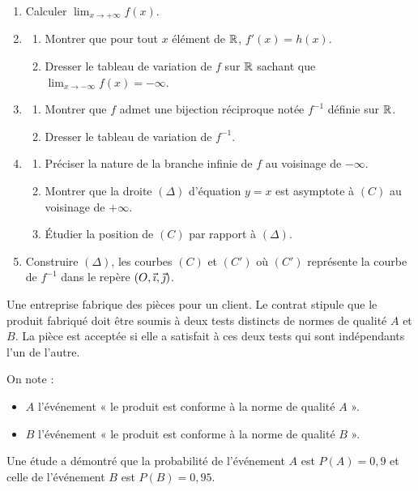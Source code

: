 \documentclass[11pt]{article}
\begin{document}
\begin{enumerate}
  \item Calculer $\displaystyle\lim_{x\to+\infty} f(x)$.
  \item \begin{enumerate}[label=\alph*.]
    \item Montrer que pour tout $x$ élément de $\mathbb{R}$, $f'(x) = h(x)$.
    \item Dresser le tableau de variation de $f$ sur $\mathbb{R}$ sachant que $\displaystyle\lim_{x\to-\infty} f(x) = -\infty$.
  \end{enumerate}
  \item \begin{enumerate}[label=\alph*.]
    \item Montrer que $f$ admet une bijection réciproque notée $f^{-1}$ définie sur $\mathbb{R}$.
    \item Dresser le tableau de variation de $f^{-1}$.
  \end{enumerate}
  \item \begin{enumerate}[label=\alph*.]
    \item Préciser la nature de la branche infinie de $f$ au voisinage de $-\infty$.
    \item Montrer que la droite $(\Delta)$ d'équation $y = x$ est asymptote à $(C)$ au voisinage de $+\infty$.
    \item Étudier la position de $(C)$ par rapport à $(\Delta)$.
  \end{enumerate}
  \item Construire $(\Delta)$, les courbes $(C)$ et $(C')$ où $(C')$ représente la courbe de $f^{-1}$ dans le repère $(O,\vec{\imath},\vec{\jmath})$.
\end{enumerate}


Une entreprise fabrique des pièces pour un client. Le contrat stipule que le produit fabriqué doit être soumis à deux tests distincts de normes de qualité $A$ et $B$. La pièce est acceptée si elle a satisfait à ces deux tests qui sont indépendants l'un de l'autre.

On note :
\begin{itemize}
  \item $A$ l'événement « le produit est conforme à la norme de qualité $A$ ».
  \item $B$ l'événement « le produit est conforme à la norme de qualité $B$ ».
\end{itemize}
Une étude a démontré que la probabilité de l'événement $A$ est $P(A) = 0{,}9$ et celle de l'événement $B$ est $P(B) = 0{,}95$.
\end{document}
